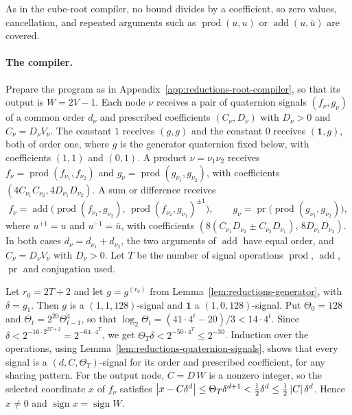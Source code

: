 As in the cube-root compiler, no bound divides by a coefficient, so zero
values, cancellation, and repeated arguments such as $\operatorname{prod}(u,u)$ or $\operatorname{add}(u,\bar u)$
are covered.

\paragraph{The compiler.}
Prepare the program as in Appendix~\ref{app:reductions-root-compiler}, so that
its output is $W=2V-1$. Each node $\nu$ receives a pair of quaternion signals
$(f_\nu,g_\nu)$ of a common order $d_\nu$ and prescribed coefficients
$(C_\nu,D_\nu)$ with $D_\nu>0$ and $C_\nu=D_\nu V_\nu$. The constant $1$ receives
$(g,g)$ and the constant $0$ receives $(\mathbf1,g)$, both of order one, where
$g$ is the generator quaternion fixed below, with coefficients $(1,1)$ and
$(0,1)$. A product $\nu=\nu_1\nu_2$ receives $f_\nu=\operatorname{prod}(f_{\nu_1},f_{\nu_2})$ and
$g_\nu=\operatorname{prod}(g_{\nu_1},g_{\nu_2})$, with coefficients $(4C_{\nu_1}C_{\nu_2},
4D_{\nu_1}D_{\nu_2})$. A sum or difference receives
\[
 f_\nu=\operatorname{add}\bigl(\operatorname{prod}(f_{\nu_1},g_{\nu_2}),\,\operatorname{prod}(f_{\nu_2},g_{\nu_1})^{\pm1}\bigr),\qquad
 g_\nu=\operatorname{pr}\bigl(\operatorname{prod}(g_{\nu_1},g_{\nu_2})\bigr),
\]
where $u^{+1}=u$ and $u^{-1}=\bar u$, with coefficients
$(8(C_{\nu_1}D_{\nu_2}\pm C_{\nu_2}D_{\nu_1}),\,8D_{\nu_1}D_{\nu_2})$. In both cases
$d_\nu=d_{\nu_1}+d_{\nu_2}$, the two arguments of $\operatorname{add}$ have equal order, and
$C_\nu=D_\nu V_\nu$ with $D_\nu>0$. Let $T$ be the number of signal operations
$\operatorname{prod}$, $\operatorname{add}$, $\operatorname{pr}$ and conjugation
used.

Let $r_0=2T+2$ and let $g=g^{(r_0)}$ from Lemma~\ref{lem:reductions-generator},
with $\delta=g_1$. Then $g$ is a $(1,1,128)$-signal and $\mathbf1$ a
$(1,0,128)$-signal. Put $\Theta_0=128$ and $\Theta_t=2^{20}\Theta_{t-1}^4$, so that
$\log_2\Theta_t=(41\cdot4^t-20)/3<14\cdot4^t$. Since
$\delta<2^{-16\cdot2^{2T+2}}=2^{-64\cdot4^T}$, we get
$\Theta_T\delta<2^{-50\cdot4^T}\le2^{-30}$. Induction over the operations, using
Lemma~\ref{lem:reductions-quaternion-signals}, shows that every signal is a
$(d,C,\Theta_T)$-signal for its order and prescribed coefficient, for any
sharing pattern. For the output node, $C=D\,W$ is a nonzero integer, so the
selected coordinate $x$ of $f_\nu$ satisfies
$\left\lvert x-C\delta^d\right\rvert\le\Theta_T\delta^{d+1}<\frac12\delta^d\le\frac12\left\lvert C\right\rvert\delta^d$.
Hence $x\ne0$ and $\operatorname{sign}x=\operatorname{sign}W$.

